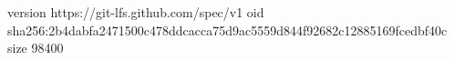 version https://git-lfs.github.com/spec/v1
oid sha256:2b4dabfa2471500c478ddcacca75d9ac5559d844f92682c12885169fcedbf40c
size 98400
